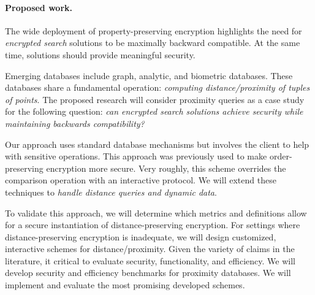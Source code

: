 \documentclass[11pt]{article}
\begin{document}
\paragraph{Proposed work.}
The wide deployment of property-preserving encryption highlights the need for \emph{encrypted search} solutions to be maximally backward compatible.  At the same time, solutions should provide meaningful security.

Emerging databases include graph, analytic, and
biometric databases. These databases share a fundamental operation: {\em
computing distance/proximity of tuples of points}. The proposed research will
consider proximity queries as a case study for the following question: \emph{can encrypted search solutions achieve security while maintaining backwards compatibility?}  

Our approach uses standard database mechanisms but involves the
client to help with sensitive operations. This approach was previously used to make order-preserving encryption more secure. Very roughly, this scheme overrides the comparison operation with an interactive protocol.  We will extend these techniques to
{\em handle distance queries and dynamic data}.

To validate this approach, we will determine which metrics and definitions allow for a secure instantiation of distance-preserving encryption. For settings where distance-preserving encryption is inadequate, we will design
customized, interactive schemes for distance/proximity. Given the variety of claims in the literature, it critical to evaluate security, functionality, and efficiency.  We will develop security and efficiency benchmarks for proximity databases. We will implement and evaluate the most promising developed schemes.

%
%
\end{document}
